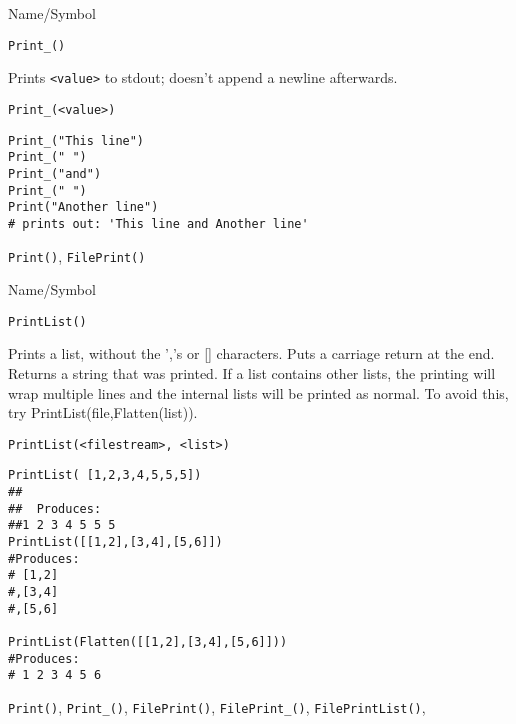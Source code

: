 \begin{desc}{Name/Symbol}
\item[Name/Symbol]	\verb+Print_()+

\item[Description]	Prints \verb+<value>+ to stdout; doesn't append a newline afterwards.

\item[Usage]		
\begin{verbatim}
Print_(<value>)
\end{verbatim}

\item[Example]	
\begin{verbatim}
Print_("This line")
Print_(" ")
Print_("and")
Print_(" ")
Print("Another line")
# prints out: 'This line and Another line'
\end{verbatim}

\item[See Also]	\verb+Print()+, \verb+FilePrint()+
\end{desc}

\rl

\begin{desc}{Name/Symbol}
\item[Name/Symbol]	\verb+PrintList()+

\item[Description]	Prints a list, without the ','s or []
  characters. Puts a carriage return at the end.  Returns a string
  that was printed.  If a list contains other lists, the printing will
  wrap multiple lines and the internal lists will be printed as
  normal.  To avoid this, try PrintList(file,Flatten(list)).

\item[Usage]
\begin{verbatim}
PrintList(<filestream>, <list>)
\end{verbatim}

\item[Example]
\begin{verbatim}
PrintList( [1,2,3,4,5,5,5])
##
##  Produces:
##1 2 3 4 5 5 5
PrintList([[1,2],[3,4],[5,6]])
#Produces:
# [1,2]
#,[3,4]
#,[5,6]

PrintList(Flatten([[1,2],[3,4],[5,6]]))
#Produces:
# 1 2 3 4 5 6

\end{verbatim}

\item[See Also]	\verb+Print()+, \verb+Print_()+, \verb+FilePrint()+, \verb+FilePrint_()+, \verb+FilePrintList()+,
\end{desc}

